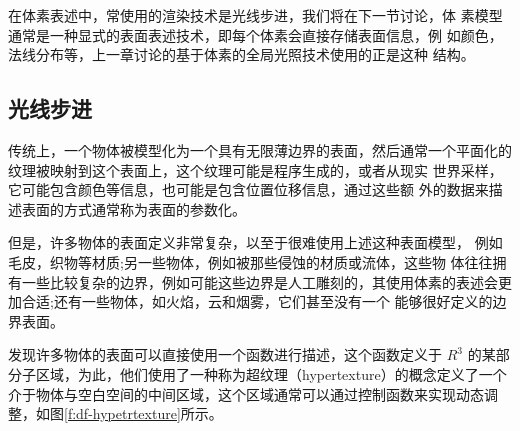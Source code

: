 在体素表述中，常使用的渲染技术是光线步进，我们将在下一节讨论，体 素模型通常是一种显式的表面表述技术，即每个体素会直接存储表面信息，例 如颜色，法线分布等，上一章讨论的基于体素的全局光照技术使用的正是这种 结构。




\subsection{光线步进}
传统上，一个物体被模型化为一个具有无限薄边界的表面，然后通常一个平面化的纹理被映射到这个表面上，这个纹理可能是程序生成的，或者从现实 世界采样，它可能包含颜色等信息，也可能是包含位置位移信息，通过这些额 外的数据来描述表面的方式通常称为表面的参数化。

但是，许多物体的表面定义非常复杂，以至于很难使用上述这种表面模型， 例如毛皮，织物等材质;另一些物体，例如被那些侵蚀的材质或流体，这些物 体往往拥有一些比较复杂的边界，例如可能这些边界是人工雕刻的，其使用体素的表述会更加合适;还有一些物体，如火焰，云和烟雾，它们甚至没有一个 能够很好定义的边界表面。

\cite{a:hypetrtexture}发现许多物体的表面可以直接使用一个函数进行描述，这个函数定义于 $R^{3}$ 的某部分子区域，为此，他们使用了一种称为超纹理（hypertexture）的概念定义了一个介于物体与空白空间的中间区域，这个区域通常可以通过控制函数来实现动态调整，如图\ref{f:df-hypetrtexture}所示。

